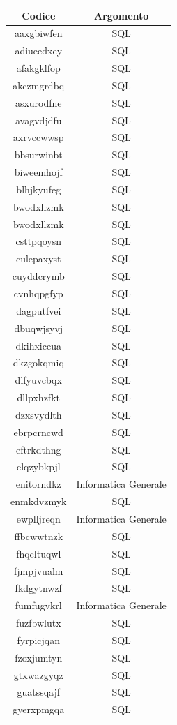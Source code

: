 \begin{longtable}{|c|c|}
	\hline
	\textbf{Codice} & \textbf{Argomento} \\\hline\hline
aaxgbiwfen & SQL \\
adiueedxey & SQL \\
afakgklfop & SQL \\
akczmgrdbq & SQL \\
asxurodfne & SQL \\
avagvdjdfu & SQL \\
axrvccwwsp & SQL \\
bbsurwinbt & SQL \\
biweemhojf & SQL \\
blhjkyufeg & SQL \\
bwodxllzmk & SQL \\
bwodxllzmk & SQL \\
csttpqoysn & SQL \\
culepaxyst & SQL \\
cuyddcrymb & SQL \\
cvnhqpgfyp & SQL \\
dagputfvei & SQL \\
dbuqwjsyvj & SQL \\
dkihxiceua & SQL \\
dkzgokqmiq & SQL \\
dlfyuvcbqx & SQL \\
dllpxhzfkt & SQL \\
dzxsvydlth & SQL \\
ebrpcrncwd & SQL \\
eftrkdthng & SQL \\
elqzybkpjl & SQL \\
enitorndkz & Informatica Generale \\
enmkdvzmyk & SQL \\
ewplljreqn & Informatica Generale \\
ffbcwwtnzk & SQL \\
fhqcltuqwl & SQL \\
fjmpjvualm & SQL \\
fkdgytnwzf & SQL \\
fumfugvkrl & Informatica Generale \\
fuzfbwlutx & SQL \\
fyrpicjqan & SQL \\
fzoxjumtyn & SQL \\
gtxwazgyqz & SQL \\
guatssqajf & SQL \\
gyerxpmgqa & SQL \\

\end{longtable}
